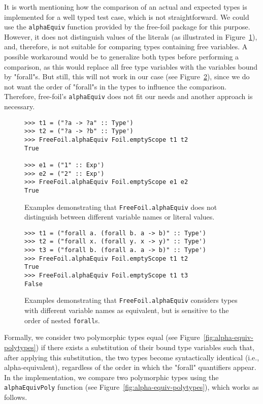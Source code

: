 It is worth mentioning how the comparison of an actual and expected types is implemented for a well typed test case, which is not straightforward. We could use the \texttt{alphaEquiv} function provided by the free-foil package for this purpose. However, it does not distinguish values of the literals (as illustrated in Figure~\ref{fig:freefoil-alphaequiv-literals}), and, therefore, is not suitable for comparing types containing free variables. A possible workaround would be to generalize both types before performing a comparison, as this would replace all free type variables with the variables bound by "forall"s. But still, this will not work in our case (see Figure~\ref{fig:freefoil-alphaequiv-foralls}), since we do not want the order of "forall"s in the types to influence the comparison. Therefore, free-foil's \texttt{alphaEquiv} does not fit our needs and another approach is necessary.

\begin{figure}[H]
  \begin{verbatim}
>>> t1 = ("?a -> ?a" :: Type')
>>> t2 = ("?a -> ?b" :: Type')
>>> FreeFoil.alphaEquiv Foil.emptyScope t1 t2
True

>>> e1 = ("1" :: Exp')
>>> e2 = ("2" :: Exp')
>>> FreeFoil.alphaEquiv Foil.emptyScope e1 e2
True
  \end{verbatim}
  \caption{Examples demonstrating that \texttt{FreeFoil.alphaEquiv} does not distinguish between different variable names or literal values.}
  \label{fig:freefoil-alphaequiv-literals}
\end{figure}

\begin{figure}[H]
  \begin{verbatim}
>>> t1 = ("forall a. (forall b. a -> b)" :: Type')
>>> t2 = ("forall x. (forall y. x -> y)" :: Type')
>>> t3 = ("forall b. (forall a. a -> b)" :: Type')
>>> FreeFoil.alphaEquiv Foil.emptyScope t1 t2
True
>>> FreeFoil.alphaEquiv Foil.emptyScope t1 t3
False
  \end{verbatim}
  \caption{Examples demonstrating that \texttt{FreeFoil.alphaEquiv} considers types with different variable names as equivalent, but is sensitive to the order of nested \texttt{forall}s.}
  \label{fig:freefoil-alphaequiv-foralls}
\end{figure}

Formally, we consider two polymorphic types equal (see Figure~\ref{fig:alpha-equiv-polytypes}) if there exists a substitution of their bound type variables such that, after applying this substitution, the two types become syntactically identical (i.e., alpha-equivalent), regardless of the order in which the "forall" quantifiers appear. In the implementation, we compare two polymorphic types using the \texttt{alphaEquivPoly} function (see Figure~\ref{fig:alpha-equiv-polytypes}), which works as follows.

